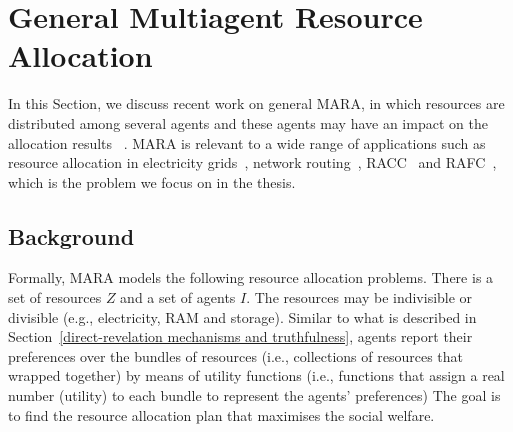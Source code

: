 \documentclass[11pt]{phdthesis}
\begin{document}
\section{General Multiagent Resource Allocation} \label{general-multiagent-resource-allocation}
In this Section, we discuss recent work on general MARA, in which resources are distributed among several agents and these agents may have an impact on the allocation results ~\citep{chevaleyre2006issues}. MARA is relevant to a wide range of applications such as resource allocation in electricity grids~\citep{gradwell2005distributed}, network routing~\citep{feldmann2003selfish}, RACC~\citep{wang2017multiagent} and RAFC~\citep{yi2015survey}, which is the problem we focus on in the thesis. 

\subsection{Background} \label{multiagent resource allocation}

Formally, MARA models the following resource allocation problems. There is a set of resources $ Z $ and a set of agents $ I $. The resources may be indivisible or divisible (e.g., electricity, RAM and storage). Similar to what is described in Section~\ref{direct-revelation mechanisms and truthfulness}, agents report their preferences over the bundles of resources (i.e., collections of resources that wrapped together) by means of utility functions
(i.e., functions that assign a real number (utility) to each bundle to represent the  agents' preferences) 
The goal is to find the resource allocation plan that maximises the social welfare.
\end{document}
